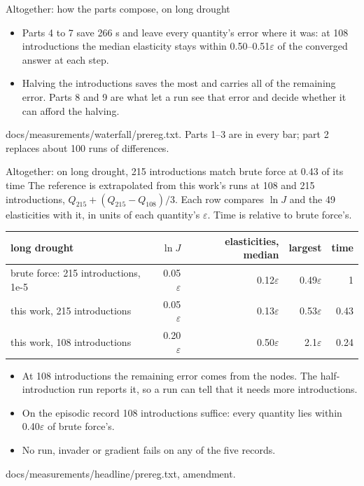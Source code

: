 \documentclass[aspectratio=169,10pt]{beamer}
\newcommand{\src}[1]{\par\vfill{\tiny\color{quiet} #1}}
\begin{document}
\begin{frame}{Altogether: how the parts compose, on long drought}
\begin{itemize}
      the headline's: its $J$ is the same to the bit.
    \item Parts 4 to 7 save 266 s and leave every quantity's error where it was: at 108
      introductions the median elasticity stays within 0.50--0.51$\varepsilon$ of the converged answer
      at each step.
    \item Halving the introductions saves the most and carries all of the remaining error.
      Parts 8 and 9 are what let a run see that error and decide whether it can afford the halving.
  \end{itemize}
  \src{docs/measurements/waterfall/prereg.txt. Parts 1--3 are in every bar; part 2 replaces about 100 runs of differences.}
\end{frame}

\begin{frame}{Altogether: on long drought, 215 introductions match brute force at 0.43 of its time}
  \small
  The reference is extrapolated from this work's runs at 108 and 215 introductions,
  $Q_{215} + (Q_{215} - Q_{108})/3$. Each row compares $\ln J$ and the 49 elasticities with it,
  in units of each quantity's $\varepsilon$. Time is relative to brute force's.
  \medskip

  \centering
  \begin{tabular}{@{}lrrrr@{}}
    \toprule
    long drought & $\ln J$ & elasticities, median & largest & time \\
    \midrule
    brute force: 215 introductions, 1e-5 & 0.05$\varepsilon$ & 0.12$\varepsilon$ & 0.49$\varepsilon$ & 1 \\
    this work, 215 introductions & 0.05$\varepsilon$ & 0.13$\varepsilon$ & 0.53$\varepsilon$ & 0.43 \\
    this work, 108 introductions & 0.20$\varepsilon$ & 0.50$\varepsilon$ & 2.1$\varepsilon$ & 0.24 \\
    \bottomrule
  \end{tabular}
  \raggedright
  \medskip
  \begin{itemize}
    \item At 108 introductions the remaining error comes from the nodes. The half-introduction run
      reports it, so a run can tell that it needs more introductions.
    \item On the episodic record 108 introductions suffice: every quantity lies within
      0.40$\varepsilon$ of brute force's.
    \item No run, invader or gradient fails on any of the five records.
  \end{itemize}
  \src{docs/measurements/headline/prereg.txt, amendment.}
\end{frame}
\end{document}
